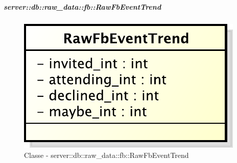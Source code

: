 			\subparagraph{server::db::raw\_data::fb::RawFbEventTrend} %
			\label{subp:server_db_raw_data_fb_rowfbeventtrend}
				\begin{figure}[htbp]
					\centering
					\centerline{\includegraphics[scale=0.75]{./images/server/classes/db/raw_fb_event_trend.pdf}}
					\caption{Classe - server::db::raw\_data::fb::RawFbEventTrend}
				\end{figure}
